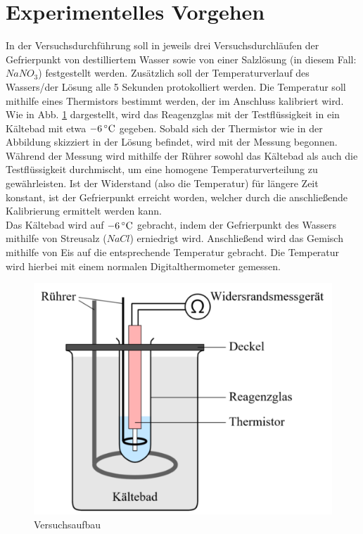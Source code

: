 \section{Experimentelles Vorgehen}
In der Versuchsdurchführung soll in jeweils drei Versuchsdurchläufen der Gefrierpunkt von destilliertem Wasser sowie von einer Salzlösung (in diesem Fall: $NaNO_3$) festgestellt werden. Zusätzlich soll der Temperaturverlauf des Wassers/der Lösung alle 5 Sekunden protokolliert werden. Die Temperatur soll mithilfe eines Thermistors bestimmt werden, der im Anschluss kalibriert wird. Wie in Abb. \ref{fig:aufbau} dargestellt, wird das Reagenzglas mit der Testflüssigkeit in ein Kältebad mit etwa $\unit[-6]{^\circ C}$ gegeben. Sobald sich der Thermistor wie in der Abbildung skizziert in der Lösung befindet, wird mit der Messung begonnen. Während der Messung wird mithilfe der Rührer sowohl das Kältebad als auch die Testflüssigkeit durchmischt, um eine homogene Temperaturverteilung zu gewährleisten. Ist der Widerstand (also die Temperatur) für längere Zeit konstant, ist der Gefrierpunkt erreicht worden, welcher durch die anschließende Kalibrierung ermittelt werden kann.\\
Das Kältebad wird auf $\unit[-6]{^\circ C}$ gebracht, indem der Gefrierpunkt des Wassers mithilfe von Streusalz ($NaCl$) erniedrigt wird. Anschließend wird das Gemisch mithilfe von Eis auf die entsprechende Temperatur gebracht. Die Temperatur wird hierbei mit einem normalen Digitalthermometer gemessen.


\begin{figure}
\begin{center}
\includegraphics[scale=0.5]{Bilder/Versuchsaufbau.png}
\caption{Versuchsaufbau}
\label{fig:aufbau}
\end{center}
\end{figure}